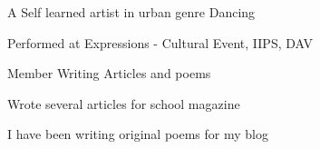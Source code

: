 \begin{cventries}
  \cventry
    {A Self learned artist in urban genre}
    {Dancing}
    {}
    {}
    {
      \begin{cvitems}
        \item {Performed at Expressions - Cultural Event, IIPS, DAV}
      \end{cvitems}
    }
  \cventry
    {Member}
    {Writing Articles and poems}
    {}
    {}
    {
      \begin{cvitems}
        \item {Wrote several articles for school magazine}
        \item {I have been writing original poems for my blog}
      \end{cvitems}
    }
\end{cventries}
